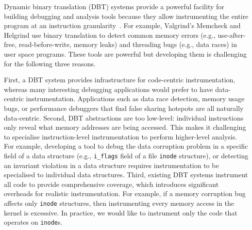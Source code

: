 \documentclass[letterpaper,twocolumn,10pt]{article}
\begin{document}
Dynamic binary translation (DBT) systems provide a powerful facility for building debugging and analysis tools because they allow instrumenting the entire program at an instruction granularity~\cite{DynamoRIOKernel}. For example, Valgrind's Memcheck \cite{Seward:2005:UVD:1247360.1247362} and Helgrind \cite{Muehlenfeld:2007:FDM:1229428.1229457} use binary translation to detect common memory errors (e.g., use-after-free, read-before-write, memory leaks) and threading bugs (e.g., data races) in user space programs. These tools are powerful but developing them is challenging for the following three reasons.

First, a DBT system provides infrastructure for code-centric instrumentation, whereas many interesting debugging applications would prefer to have data-centric instrumentation. Applications such as data race detection, memory usage bugs, or performance debuggers that find false sharing hotspots are all naturally data-centric. 
Second, DBT abstractions are too low-level: individual instructions only reveal what memory addresses are being accessed. This makes it challenging to specialise instruction-level instrumentation to perform higher-level analysis. For example, developing a tool to debug the data corruption problem in a specific field of a data structure (e.g., \texttt{i\_flags} field of a file \texttt{inode} structure), or detecting an invariant violation in a data structure requires instrumentation to be specialised to individual data structures.
Third, existing DBT systems instrument all code to provide comprehensive coverage, which introduces significant overheads for realistic instrumentation. For example, if a memory corruption bug affects only \texttt{inode} structures, then instrumenting every memory access in the kernel is excessive. In practice, we would like to instrument only the code that operates on \texttt{inode}s.
\end{document}
